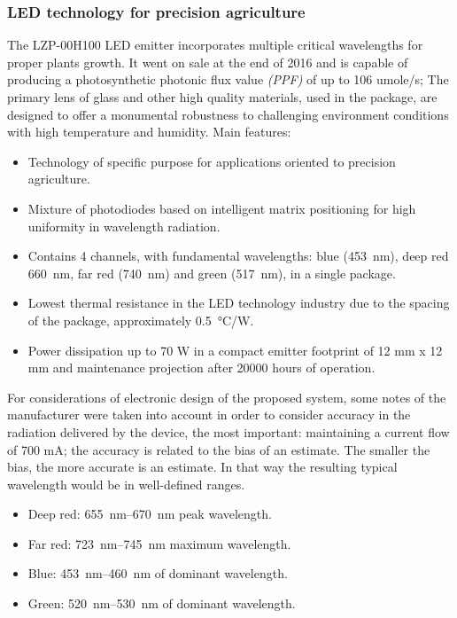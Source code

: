\documentclass[letterpaper,12pt,twoside]{articleingud}
\begin{document}
\subsubsection{LED technology for precision agriculture}
The LZP-00H100 LED emitter incorporates multiple critical wavelengths for proper plants growth. It went on sale at the end of 2016 and is capable of producing a photosynthetic photonic flux value \textit{(PPF)} of up to 106 umole/s; The primary lens of glass and other high quality materials, used in the package, are designed to offer a monumental robustness to challenging environment conditions with high temperature and humidity.
Main features:
\begin{itemize}
    \item Technology of specific purpose for applications oriented to precision agriculture.
    \item Mixture of photodiodes based on intelligent matrix positioning for high uniformity in wavelength radiation.
    \item Contains 4 channels, with fundamental wavelengths: blue \text(\SI{453}{\nano\metre}), deep red \SI{660}{\nano\metre}, far red \text(\SI{740}{\nano\metre}) and green \text(\SI{517}{\nano\metre}), in a single package.
    \item Lowest thermal resistance in the LED technology industry due to the spacing of the package, approximately \SI{0.5}{\degreeCelsius/\watt}.
    \item Power dissipation up to 70 W in a compact emitter footprint of 12 mm x 12 mm and maintenance projection after 20000 hours of operation.
\end{itemize}
For considerations of electronic design of the proposed system, some notes of the manufacturer were taken into account in order to consider accuracy in the radiation delivered by the device, the most important: maintaining a current flow of 700 mA; the accuracy is related to the bias of an estimate. The smaller the bias, the more accurate is an estimate. In that way the resulting typical wavelength would be in well-defined ranges.
\begin{itemize}
    \item Deep red: \SIrange{655}{670}{\nano\metre} peak wavelength.
    \item Far red: \SIrange{723}{745}{\nano\metre} maximum wavelength.
    \item Blue: \SIrange{453}{460}{\nano\metre} of dominant wavelength.
    \item Green: \SIrange{520}{530}{\nano\metre} of dominant wavelength.
\end{itemize}
\end{document}
